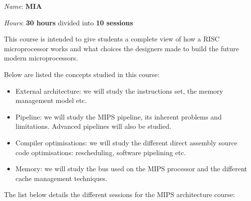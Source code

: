 \begin{multicols}{2}

\textit{Name}: \textbf{MIA}

\textit{Hours}: \textbf{30 hours} divided into \textbf{10 sessions}

This course is intended to give students a complete view of how a RISC
microprocessor works and what choices the designers made to build the
future modern microprocessors.

Below are listed the concepts studied in this course:

\begin{itemize}
  \item
    External architecture: we will study the instructions set,
    the memory management model etc.
  \item
    Pipeline: we will study the MIPS pipeline, its inherent problems
    and limitations. Advanced pipelines will also be studied.
  \item
    Compiler optimisations: we will study the different direct assembly
    source code optimisations: rescheduling, software pipelining etc.
  \item
    Memory: we will study the bus used on the MIPS processor and
    the different cache management techniques.
\end{itemize}

The list below details the different sessions for the MIPS architecture
course:


\end{multicols}
